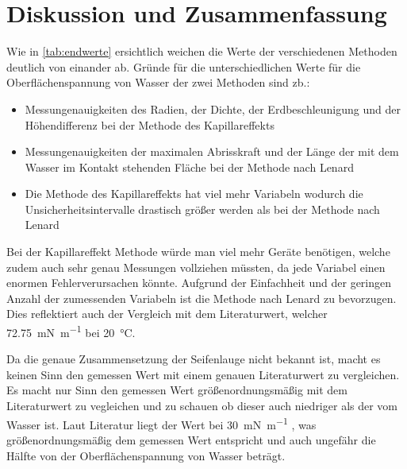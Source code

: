 \documentclass[11pt]{scrartcl}
\begin{document}
\section{Diskussion und Zusammenfassung}
\label{sec:diskussion_zusammenfassung}

Wie in \autoref{tab:endwerte} ersichtlich weichen die Werte der verschiedenen
Methoden deutlich von einander ab.
Gründe für die unterschiedlichen Werte für die Oberflächenspannung von Wasser
der zwei Methoden sind zb.:
\begin{itemize}
    \item Messungenauigkeiten des Radien, der Dichte, der 
        Erdbeschleunigung und der Höhendifferenz bei der Methode des
        Kapillareffekts
    \item Messungenauigkeiten der maximalen Abrisskraft und der Länge der
        mit dem Wasser im Kontakt stehenden Fläche bei der Methode nach 
        Lenard
    \item Die Methode des Kapillareffekts hat viel mehr Variabeln wodurch
        die Unsicherheitsintervalle drastisch größer werden als bei der
        Methode nach Lenard
\end{itemize}

Bei der Kapillareffekt Methode würde man viel mehr Geräte benötigen, welche
zudem auch sehr genau Messungen vollziehen müssten, da jede Variabel einen
enormen Fehlerverursachen könnte. Aufgrund der Einfachheit und der geringen
Anzahl der zumessenden Variabeln ist die Methode nach Lenard zu bevorzugen.
Dies reflektiert auch der Vergleich mit dem Literaturwert, welcher \SI{72.75}{\mN\per\meter}
\cite{2021Oberflache}
bei \SI{20}{\celsius}. 

Da die genaue Zusammensetzung der Seifenlauge nicht bekannt ist, macht es
keinen Sinn den gemessen Wert mit einem genauen Literaturwert zu vergleichen.
Es macht nur Sinn den gemessen Wert größenordnungsmäßig mit dem Literaturwert 
zu vegleichen und zu schauen ob dieser auch niedriger als der vom Wasser ist.
Laut Literatur liegt der Wert bei \SI{30}{\mN\per\meter} \cite{Roth2016}, was größenordnungsmäßig
dem gemessen Wert entspricht  und auch ungefähr die Hälfte von der Oberflächenspannung
von Wasser beträgt.
\end{document}
